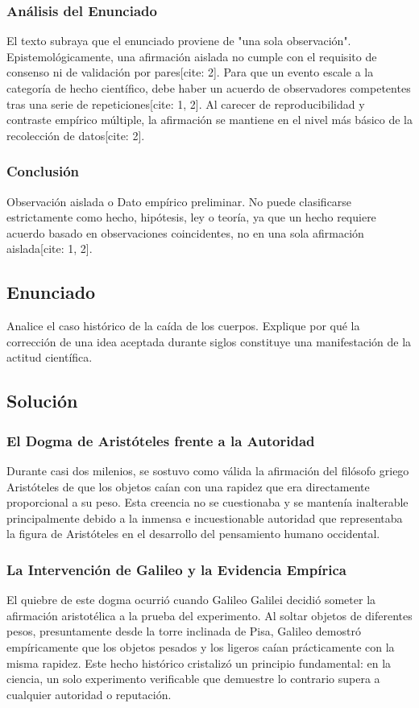 \documentclass[12pt, a4paper]{article}
\begin{document}
\subsubsection*{Análisis del Enunciado}
El texto subraya que el enunciado proviene de "una sola observación". Epistemológicamente, una afirmación aislada no cumple con el requisito de consenso ni de validación por pares[cite: 2]. Para que un evento escale a la categoría de hecho científico, debe haber un acuerdo de observadores competentes tras una serie de repeticiones[cite: 1, 2]. Al carecer de reproducibilidad y contraste empírico múltiple, la afirmación se mantiene en el nivel más básico de la recolección de datos[cite: 2].

\subsubsection*{Conclusión}
Observación aislada o Dato empírico preliminar. No puede clasificarse estrictamente como hecho, hipótesis, ley o teoría, ya que un hecho requiere acuerdo basado en observaciones coincidentes, no en una sola afirmación aislada[cite: 1, 2].

\newpage

\subsection*{Enunciado}
Analice el caso histórico de la caída de los cuerpos. Explique por qué la corrección de una idea aceptada durante siglos constituye una manifestación de la actitud científica.

\subsection*{Solución}

\subsubsection*{El Dogma de Aristóteles frente a la Autoridad}
Durante casi dos milenios, se sostuvo como válida la afirmación del filósofo griego Aristóteles de que los objetos caían con una rapidez que era directamente proporcional a su peso. Esta creencia no se cuestionaba y se mantenía inalterable principalmente debido a la inmensa e incuestionable autoridad que representaba la figura de Aristóteles en el desarrollo del pensamiento humano occidental.

\subsubsection*{La Intervención de Galileo y la Evidencia Empírica}
El quiebre de este dogma ocurrió cuando Galileo Galilei decidió someter la afirmación aristotélica a la prueba del experimento. Al soltar objetos de diferentes pesos, presuntamente desde la torre inclinada de Pisa, Galileo demostró empíricamente que los objetos pesados y los ligeros caían prácticamente con la misma rapidez. Este hecho histórico cristalizó un principio fundamental: en la ciencia, un solo experimento verificable que demuestre lo contrario supera a cualquier autoridad o reputación.
\end{document}
